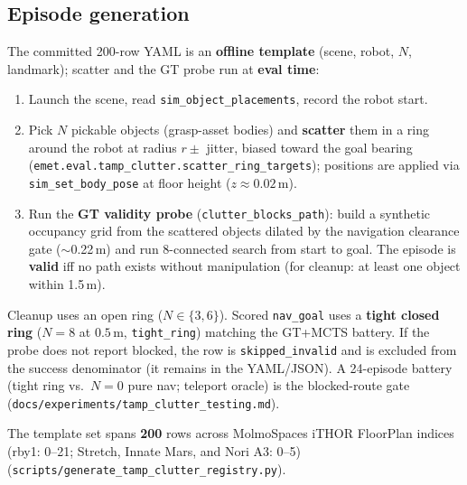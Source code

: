 \subsection{Episode generation}
The committed 200-row YAML is an \textbf{offline template} (scene, robot, $N$, landmark);
scatter and the GT probe run at \textbf{eval time}:
\begin{enumerate}
  \item Launch the scene, read \texttt{sim\_object\_placements}, record the robot start.
  \item Pick $N$ pickable objects (grasp-asset bodies) and \textbf{scatter} them in a ring
    around the robot at radius $r \pm$ jitter, biased toward the goal bearing
    (\texttt{emet.eval.tamp\_clutter.scatter\_ring\_targets}); positions are applied via
    \texttt{sim\_set\_body\_pose} at floor height ($z \approx 0.02$\,m).
  \item Run the \textbf{GT validity probe} (\texttt{clutter\_blocks\_path}): build a
    synthetic occupancy grid from the scattered objects dilated by the navigation
    clearance gate ($\sim$0.22\,m) and run 8-connected search from start to goal. The
    episode is \textbf{valid} iff no path exists without manipulation (for cleanup:
    at least one object within 1.5\,m).
\end{enumerate}

Cleanup uses an open ring ($N\in\{3,6\}$). Scored \texttt{nav\_goal} uses a \textbf{tight
closed ring} ($N{=}8$ at $0.5$\,m, \texttt{tight\_ring}) matching the GT+MCTS battery.
If the probe does not report blocked, the row is \texttt{skipped\_invalid} and is
excluded from the success denominator (it remains in the YAML/JSON). A 24-episode
battery (tight ring vs.\ $N{=}0$ pure nav; teleport oracle) is the blocked-route gate
(\texttt{docs/experiments/tamp\_clutter\_testing.md}).

The template set spans \textbf{200} rows across MolmoSpaces iTHOR FloorPlan indices
(rby1: 0--21; Stretch, Innate Mars, and Nori A3: 0--5)
(\texttt{scripts/generate\_tamp\_clutter\_registry.py}).

